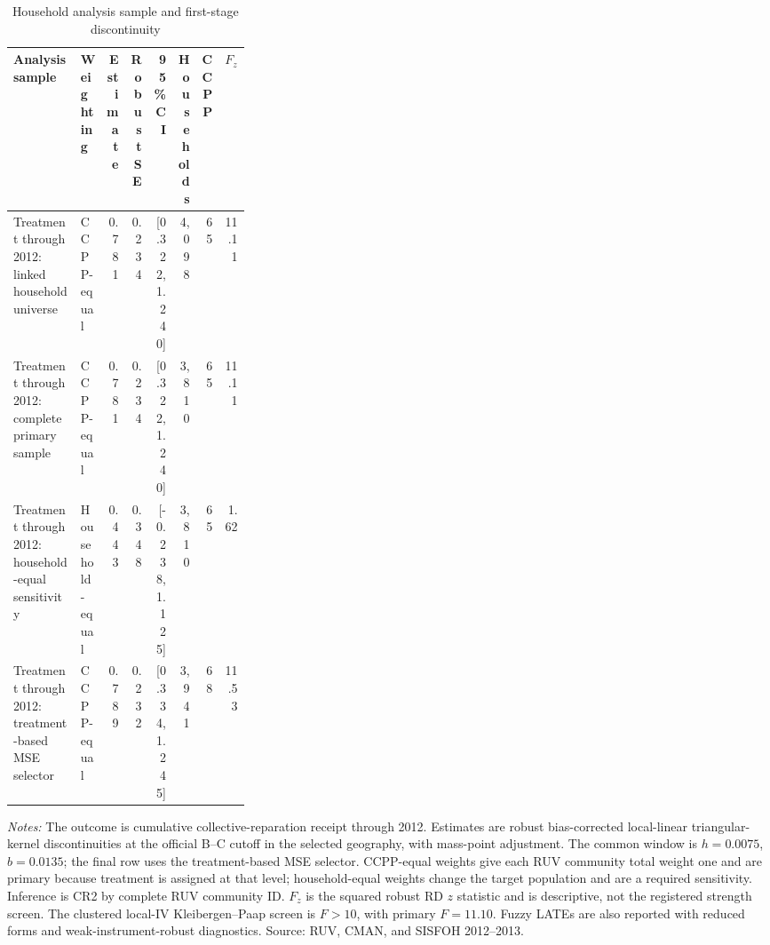 \begin{table}[!htbp]
\centering
\scriptsize
\caption{Household analysis sample and first-stage discontinuity}
\label{tab:rd_outcomes_first_stage_2013_household}
\begin{tabular}{p{0.31\linewidth}lrrrrrr}
\toprule
Analysis sample & Weighting & Estimate & Robust SE & 95\% CI & Households & CCPP & \(F_z\) \\
\midrule
Treatment through 2012: linked household universe & CCPP-equal & 0.781 & 0.234 & [0.322, 1.240] & 4,098 & 65 & 11.11 \\
Treatment through 2012: complete primary sample & CCPP-equal & 0.781 & 0.234 & [0.322, 1.240] & 3,810 & 65 & 11.11 \\
Treatment through 2012: household-equal sensitivity & Household-equal & 0.443 & 0.348 & [-0.238, 1.125] & 3,810 & 65 & 1.62 \\
Treatment through 2012: treatment-based MSE selector & CCPP-equal & 0.789 & 0.232 & [0.334, 1.245] & 3,941 & 68 & 11.53 \\
\bottomrule
\end{tabular}
\parbox{0.97\linewidth}{\footnotesize \textit{Notes:} The outcome is cumulative collective-reparation receipt through 2012. Estimates are robust bias-corrected local-linear triangular-kernel discontinuities at the official B--C cutoff in the selected geography, with mass-point adjustment. The common window is \(h=0.0075\), \(b=0.0135\); the final row uses the treatment-based MSE selector. CCPP-equal weights give each RUV community total weight one and are primary because treatment is assigned at that level; household-equal weights change the target population and are a required sensitivity. Inference is CR2 by complete RUV community ID. \(F_z\) is the squared robust RD \(z\) statistic and is descriptive, not the registered strength screen. The clustered local-IV Kleibergen--Paap screen is \(F>10\), with primary \(F=11.10\). Fuzzy LATEs are also reported with reduced forms and weak-instrument-robust diagnostics. Source: RUV, CMAN, and SISFOH 2012--2013.}
\end{table}

